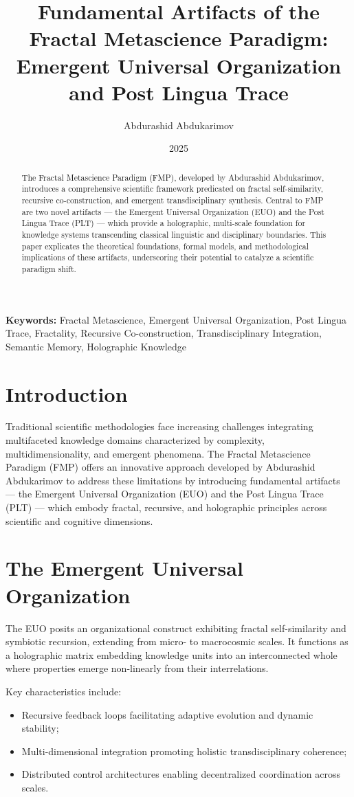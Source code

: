 \documentclass[12pt,a4paper]{article}
\title{Fundamental Artifacts of the Fractal Metascience Paradigm: \\ Emergent Universal Organization and Post Lingua Trace}
\author{Abdurashid Abdukarimov}
\date{2025}
\begin{document}
\maketitle

\begin{abstract}
The Fractal Metascience Paradigm (FMP), developed by Abdurashid Abdukarimov, introduces a comprehensive scientific framework predicated on fractal self-similarity, recursive co-construction, and emergent transdisciplinary synthesis. Central to FMP are two novel artifacts --- the Emergent Universal Organization (EUO) and the Post Lingua Trace (PLT) --- which provide a holographic, multi-scale foundation for knowledge systems transcending classical linguistic and disciplinary boundaries. This paper explicates the theoretical foundations, formal models, and methodological implications of these artifacts, underscoring their potential to catalyze a scientific paradigm shift.
\end{abstract}

\textbf{Keywords:} Fractal Metascience, Emergent Universal Organization, Post Lingua Trace, Fractality, Recursive Co-construction, Transdisciplinary Integration, Semantic Memory, Holographic Knowledge

\section{Introduction}
Traditional scientific methodologies face increasing challenges integrating multifaceted knowledge domains characterized by complexity, multidimensionality, and emergent phenomena. The Fractal Metascience Paradigm (FMP) offers an innovative approach developed by Abdurashid Abdukarimov to address these limitations by introducing fundamental artifacts --- the Emergent Universal Organization (EUO) and the Post Lingua Trace (PLT) --- which embody fractal, recursive, and holographic principles across scientific and cognitive dimensions.

\section{The Emergent Universal Organization}
The EUO posits an organizational construct exhibiting fractal self-similarity and symbiotic recursion, extending from micro- to macrocosmic scales. It functions as a holographic matrix embedding knowledge units into an interconnected whole where properties emerge non-linearly from their interrelations.

Key characteristics include:
\begin{itemize}
    \item Recursive feedback loops facilitating adaptive evolution and dynamic stability;
    \item Multi-dimensional integration promoting holistic transdisciplinary coherence;
    \item Distributed control architectures enabling decentralized coordination across scales.
\end{itemize}
\end{document}
